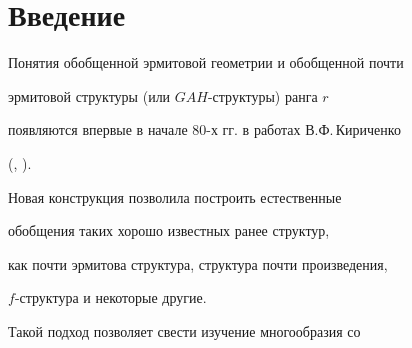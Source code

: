 \label{begin}








\section{Введение}
































Понятия обобщенной эрмитовой геометрии и обобщенной почти


эрмитовой структуры (или $GAH$-структуры) ранга $r$


появляются впервые в начале 80-х гг. в работах В.Ф.\,Кириченко


(\cite{KirVUZ}, \cite{Kir}).


Новая конструкция позволила построить естественные


обобщения таких хорошо известных ранее структур,


как почти эрмитова структура, структура почти произведения,


$f$-структура и некоторые другие.


Такой подход позволяет свести изучение многообразия со



